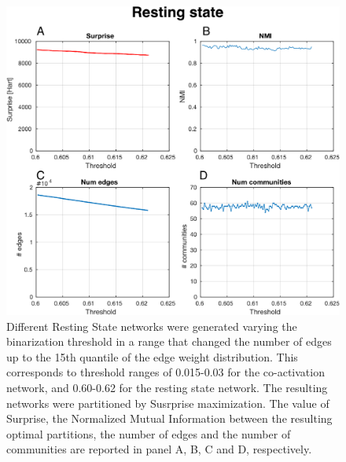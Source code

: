 \begin{figure}[htb!]
\centering
\includegraphics[width=0.7\linewidth]{images/resting_state_study_threshold.pdf}
\caption{Different Resting State networks were generated varying the binarization threshold in a range that changed the number of edges up to the 15th quantile of the edge weight distribution. This corresponds to threshold ranges of 0.015-0.03 for the co-activation network, and 0.60-0.62 for the resting state network. The resulting networks were partitioned by Susrprise maximization. The value of Surprise, the Normalized Mutual Information between the resulting optimal partitions, the number of edges and the number of communities are reported in panel A, B, C and D, respectively.}
\label{fig:figure_9_rs_threshold_study}
\end{figure}

